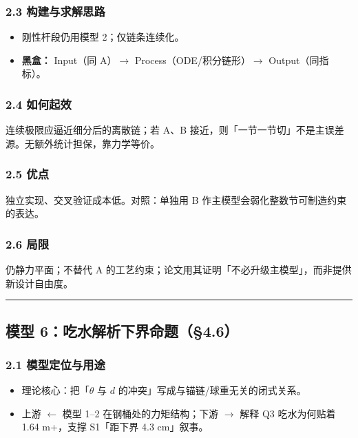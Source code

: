 \documentclass[UTF8,a4paper,zihao=-4]{ctexart}
\begin{document}
\subsubsection{\texorpdfstring{2.3 构建与求解思路}{2.3 构建与求解思路}}
\begin{itemize}[leftmargin=1.5em]
\item 刚性杆段仍用模型 2；仅链条连续化。
\item \textbf{黑盒：} Input（同 A）$\rightarrow$ Process（ODE/积分链形）$\rightarrow$ Output（同指标）。
\end{itemize}

\subsubsection{\texorpdfstring{2.4 如何起效}{2.4 如何起效}}
连续极限应逼近细分后的离散链；若 A、B 接近，则「一节一节切」不是主误差源。无额外统计担保，靠力学等价。

\subsubsection{\texorpdfstring{2.5 优点}{2.5 优点}}
独立实现、交叉验证成本低。对照：单独用 B 作主模型会弱化整数节可制造约束的表达。

\subsubsection{\texorpdfstring{2.6 局限}{2.6 局限}}
仍静力平面；不替代 A 的工艺约束；论文用其证明「不必升级主模型」，而非提供新设计自由度。

\vspace{0.4em}\hrule\vspace{0.4em}

\subsection{\texorpdfstring{模型 6：吃水解析下界命题（§4.6）}{模型 6：吃水解析下界命题（§4.6）}}

\subsubsection{\texorpdfstring{2.1 模型定位与用途}{2.1 模型定位与用途}}
\begin{itemize}[leftmargin=1.5em]
\item 理论核心：把「\(\theta\) 与 \(d\) 的冲突」写成与锚链/球重无关的闭式关系。
\item 上游 $\leftarrow$ 模型 1--2 在钢桶处的力矩结构；下游 $\rightarrow$ 解释 Q3 吃水为何贴着 1.64 m+，支撑 S1「距下界 4.3 cm」叙事。
\end{itemize}
\end{document}
